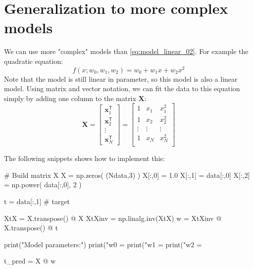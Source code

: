 \documentclass[b5paper,12pt]{article} %
\begin{document}
\section{Generalization to more complex models}

We can use more "complex" models than \eqref{eq:model_linear_02}. For example
the quadratic equation:
\begin{equation}
f(x; w_{0}, w_{1}, w_{2}) = w_{0} + w_{1}x + w_{2}x^{2}
\label{eq:quadratic_eq}
\end{equation}
Note that the model is still linear in parameter, so this model is also a linear model.
Using matrix and vector notation, we can fit the data to this equation simply by
adding one column to the matrix $\mathbf{X}$:
\begin{equation}
\mathbf{X} = \begin{bmatrix}
\mathbf{x}^{\mathsf{T}}_{1} \\
\mathbf{x}^{\mathsf{T}}_{2} \\
\vdots \\
\mathbf{x}^{\mathsf{T}}_{N}
\end{bmatrix} =
\begin{bmatrix}
1 & x_{1} & x_{1}^{2} \\
1 & x_{2} & x_{2}^{2} \\
\vdots & \vdots & \vdots \\
1 & x_{N} & x_{N}^{2} \\
\end{bmatrix}
\end{equation}

The following snippets shows how to implement this:
\begin{pythoncode}
# Build matrix X
X = np.zeros( (Ndata,3) )
X[:,0] = 1.0
X[:,1] = data[:,0]
X[:,2] = np.power( data[:,0], 2 )
  
t = data[:,1] # target
  
XtX = X.transpose() @ X
XtXinv = np.linalg.inv(XtX)
w = XtXinv @ X.transpose() @ t

print("Model parameters:")
print("w0 = %
print("w1 = %
print("w2 = %

t_pred = X @ w
\end{pythoncode}
\end{document}
